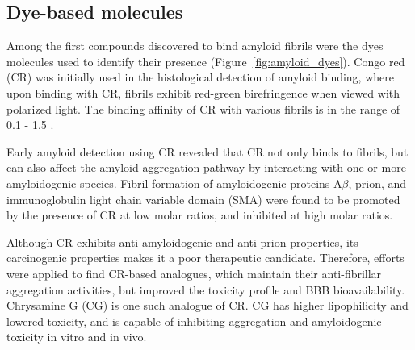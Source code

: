 
\subsection{Dye-based molecules}

Among the first compounds discovered to bind amyloid fibrils were the dyes molecules used to identify their presence (Figure~\ref{fig:amyloid_dyes}). Congo red (CR) was initially used in the histological detection of amyloid binding, where upon binding with CR, fibrils exhibit red-green birefringence when viewed with polarized light.\cite{Frid:2007bo} The binding affinity of CR with various fibrils is in the range of 0.1 - 1.5 \micromolar.\cite{Lendel:2009cg,Benditt:1970va,Klunk:1989vc}

Early amyloid detection using CR revealed that CR not only binds to fibrils, but can also affect the amyloid aggregation pathway by interacting with one or more amyloidogenic species.\cite{Caspi:1998vt}
Fibril formation of amyloidogenic proteins A$\beta$,\cite{Esler:1997bq} prion,\cite{Rudyk:2000ta} and immunoglobulin light chain variable domain (SMA)\cite{Kim:2003hv} were found to be promoted by the presence of CR at low molar ratios, and inhibited at high molar ratios. 

Although CR exhibits anti-amyloidogenic and anti-prion properties, its carcinogenic properties makes it a poor therapeutic candidate. Therefore, efforts were applied to find CR-based analogues, which maintain their anti-fibrillar aggregation activities, but improved the toxicity profile and BBB bioavailability. Chrysamine G (CG) is one such analogue of CR. CG has higher lipophilicity and lowered toxicity, and is capable of inhibiting aggregation and amyloidogenic toxicity in vitro and in vivo.\cite{Klunk:1994um,Klunk:1998vm,Reinke:2007p155,Ishii:2002uf}

